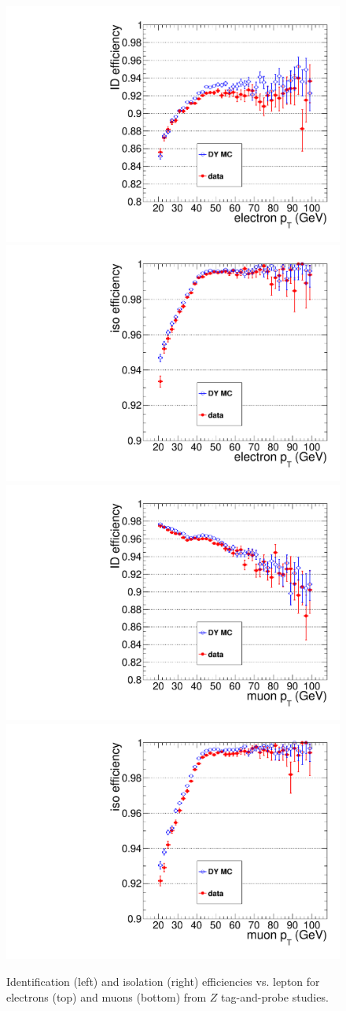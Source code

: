 \begin{figure}[tbh]
\begin{center}
\includegraphics[width=0.48\linewidth]{plots/CUT_electron_selection_nm1id.pdf}
\includegraphics[width=0.48\linewidth]{plots/CUT_electron_selection_nm1iso.pdf}
\includegraphics[width=0.48\linewidth]{plots/CUT_muon_selection_nm1id.pdf}
\includegraphics[width=0.48\linewidth]{plots/CUT_muon_selection_nm1iso.pdf}
\caption{\label{fig:tagandprobe}\protect 
Identification (left) and isolation (right) efficiencies vs. lepton \pt for electrons (top) 
and muons (bottom) from $Z$ tag-and-probe studies. 
}
\end{center}
\end{figure}



